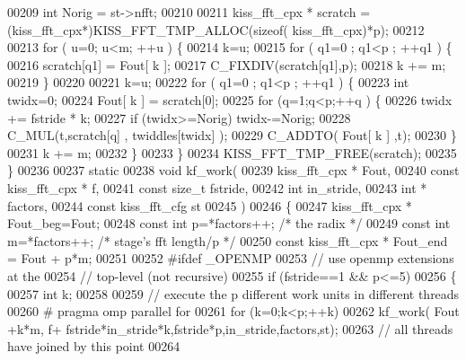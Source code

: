 \begin{DoxyCode}
00209     \textcolor{keywordtype}{int} Norig = st->nfft;
00210 
00211     kiss_fft_cpx * scratch = (kiss_fft_cpx*)KISS_FFT_TMP_ALLOC(\textcolor{keyword}{sizeof}(
      kiss_fft_cpx)*p);
00212 
00213     \textcolor{keywordflow}{for} ( u=0; u<m; ++u ) \{
00214         k=u;
00215         \textcolor{keywordflow}{for} ( q1=0 ; q1<p ; ++q1 ) \{
00216             scratch[q1] = Fout[ k  ];
00217             C_FIXDIV(scratch[q1],p);
00218             k += m;
00219         \}
00220 
00221         k=u;
00222         \textcolor{keywordflow}{for} ( q1=0 ; q1<p ; ++q1 ) \{
00223             \textcolor{keywordtype}{int} twidx=0;
00224             Fout[ k ] = scratch[0];
00225             \textcolor{keywordflow}{for} (q=1;q<p;++q ) \{
00226                 twidx += fstride * k;
00227                 \textcolor{keywordflow}{if} (twidx>=Norig) twidx-=Norig;
00228                 C_MUL(t,scratch[q] , twiddles[twidx] );
00229                 C_ADDTO( Fout[ k ] ,t);
00230             \}
00231             k += m;
00232         \}
00233     \}
00234     KISS_FFT_TMP_FREE(scratch);
00235 \}
00236 
00237 \textcolor{keyword}{static}
00238 \textcolor{keywordtype}{void} kf_work(
00239         kiss_fft_cpx * Fout,
00240         \textcolor{keyword}{const} kiss_fft_cpx * f,
00241         \textcolor{keyword}{const} \textcolor{keywordtype}{size\_t} fstride,
00242         \textcolor{keywordtype}{int} in\_stride,
00243         \textcolor{keywordtype}{int} * factors,
00244         \textcolor{keyword}{const} kiss_fft_cfg st
00245         )
00246 \{
00247     kiss_fft_cpx * Fout\_beg=Fout;
00248     \textcolor{keyword}{const} \textcolor{keywordtype}{int} p=*factors++; \textcolor{comment}{/* the radix  */}
00249     \textcolor{keyword}{const} \textcolor{keywordtype}{int} m=*factors++; \textcolor{comment}{/* stage's fft length/p */}
00250     \textcolor{keyword}{const} kiss_fft_cpx * Fout\_end = Fout + p*m;
00251 
00252 \textcolor{preprocessor}{#ifdef \_OPENMP}
00253     \textcolor{comment}{// use openmp extensions at the }
00254     \textcolor{comment}{// top-level (not recursive)}
00255     \textcolor{keywordflow}{if} (fstride==1 && p<=5)
00256     \{
00257         \textcolor{keywordtype}{int} k;
00258 
00259         \textcolor{comment}{// execute the p different work units in different threads}
00260 \textcolor{preprocessor}{#       pragma omp parallel for}
00261         \textcolor{keywordflow}{for} (k=0;k<p;++k) 
00262             kf_work( Fout +k*m, f+ fstride*in\_stride*k,fstride*p,in\_stride,factors,st);
00263         \textcolor{comment}{// all threads have joined by this point}
00264 

\end{DoxyCode}

